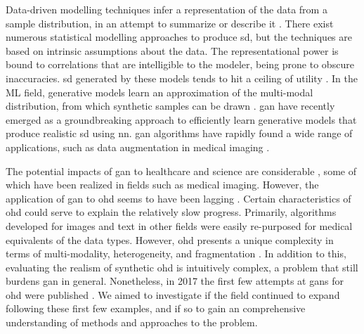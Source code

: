         Data-driven modelling techniques infer a representation of the data from a sample distribution, in an attempt to summarize or describe it \cite{Hand2019}. There exist numerous statistical modelling approaches to produce \gls{sd}, but the techniques are based on intrinsic assumptions about the data. The representational power is bound to correlations that are intelligible to the modeler, being prone to obscure inaccuracies. \gls{sd} generated by these models tends to hit a ceiling of utility \cite{Rankin2020}. In the ML field, generative models learn an approximation of the multi-modal distribution, from which synthetic samples can be drawn \cite{goodgan}. \Gls{gan} \cite{goodgan} have recently emerged as a groundbreaking approach to efficiently learn generative models that produce realistic \gls{sd} using \gls{nn}. \gls{gan} algorithms have rapidly found a wide range of applications, such as data augmentation in medical imaging \cite{Yi2019, Wang2020, Zhou2020}.\par
        
        The potential impacts of \gls{gan} to healthcare and science are considerable \cite{Rankin2020}, some of which have been realized in fields such as medical imaging. However, the application of \gls{gan} to \gls{ohd} seems to have been lagging \cite{Xiao_2018_chall}. Certain characteristics of \gls{ohd} could serve to explain the relatively slow progress. Primarily, algorithms developed for images and text in other fields were easily re-purposed for medical equivalents of the data types. However, \gls{ohd} presents a unique complexity in terms of multi-modality, heterogeneity, and fragmentation \cite{Xiao_2018_chall}. In addition to this, evaluating the realism of synthetic \gls{ohd} is intuitively complex, a problem that still burdens \gls{gan} in general. Nonetheless, in 2017 the first few attempts at \glspl{gan} for \gls{ohd} were published \cite{esteban2017real,Che_2017,Choi2017-nt,yahi2017generative}. We aimed to investigate if the field continued to expand following these first few examples, and if so to gain an comprehensive understanding of methods and approaches to the problem.